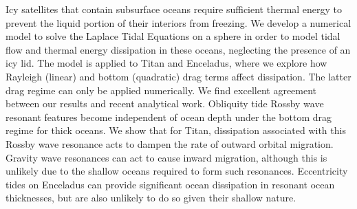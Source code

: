 Icy satellites that contain subsurface oceans require sufficient thermal energy to prevent the liquid portion of their interiors from freezing. We develop a numerical model to solve the Laplace Tidal Equations on a sphere in order to model tidal flow and thermal energy dissipation in these oceans, neglecting the presence of an icy lid. The model is applied to Titan and Enceladus, where we explore how Rayleigh (linear) and bottom (quadratic) drag terms affect dissipation. The latter drag regime can only be applied numerically. We find excellent agreement between our results and recent analytical work. Obliquity tide Rossby wave resonant features become independent of ocean depth under the bottom drag regime for thick oceans. We show that for Titan, dissipation associated with this Rossby wave resonance acts to dampen the rate of outward orbital migration. Gravity wave resonances can act to cause inward migration, although this is unlikely due to the shallow oceans required to form such resonances. Eccentricity tides on Enceladus can provide significant ocean dissipation in resonant ocean thicknesses, but are also unlikely to do so given their shallow nature.